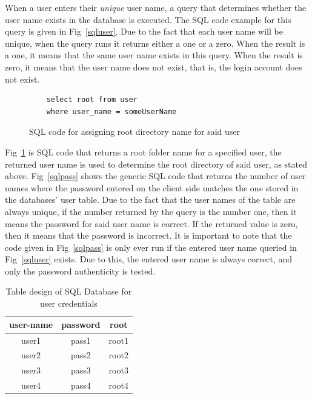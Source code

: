 \documentclass[journal, a4paper]{IEEEtran}
\begin{document}
When a user enters their \textit{unique} user name, a query that determines whether the user name exists in the database is executed. The SQL code example for this query is given in Fig~\ref{sqluser}. Due to the fact that each user name will be unique, when the query runs it returns either a one or a zero. When the result is a one, it means that the same user name exists in this query. When the result is zero, it means that the user name does not exist, that is, the login account does not exist.

\begin{figure}[hbtp]
	\begin{lstlisting}
	select root from user
	where user_name = someUserName
	\end{lstlisting}
	\caption{SQL code for assigning root directory name for said user}
	\label {sqlroot}
\end{figure}

Fig~\ref{sqlroot} is SQL code that returns a root folder name  for a specified user, the returned user name is used to determine the root directory of said user, as stated above. Fig~\ref{sqlpass} shows the generic SQL code that returns the number of user names where the password entered on the client side matches the one stored in the databases' user table. Due to the fact that the user names of the table are always unique, if the number returned by the query is the number one, then it means the password for said user name is correct. If the returned value is zero, then it means that the password is incorrect. It is important to note that the code given in Fig~\ref{sqlpass} is only ever run if the entered user name queried in Fig~\ref{sqluser} exists. Due to this, the entered user name is always correct, and only the password authenticity is tested.



\begin{table}[hbtp!]
	\caption{Table design of SQL Database for user credentials}
	\label{tasks}
	\begin{center}
		\begin{tabular}{| c | c | c |}
			\hline
			user-name & password & root\\
			\hline
			user1 & pass1 & root1\\
			\hline
			user2 & pass2 & root2\\
			\hline
			user3 & pass3 & root3\\
			\hline
			user4 & pass4 & root4\\
			\hline
		\end{tabular}
	\end{center}
\end{table}
\end{document}
